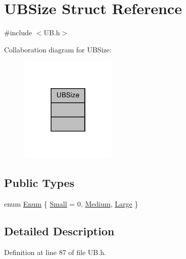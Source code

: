 \hypertarget{struct_u_b_size}{\section{U\-B\-Size Struct Reference}
\label{d5/d5e/struct_u_b_size}
}


{\ttfamily \#include $<$U\-B.\-h$>$}



Collaboration diagram for U\-B\-Size\-:
\nopagebreak
\begin{figure}[H]
\begin{center}
\leavevmode
\includegraphics[width=130pt]{d4/d0b/struct_u_b_size__coll__graph}
\end{center}
\end{figure}
\subsection*{Public Types}
\begin{DoxyCompactItemize}
\item 
enum \hyperlink{struct_u_b_size_a7ea37366b0131977382c1412689659a6}{Enum} \{ \hyperlink{struct_u_b_size_a7ea37366b0131977382c1412689659a6a0ac946f885859a3db87fef6e0a5411a6}{Small} =  0, 
\hyperlink{struct_u_b_size_a7ea37366b0131977382c1412689659a6ac239b174a88775ab9862fc9043931d5d}{Medium}, 
\hyperlink{struct_u_b_size_a7ea37366b0131977382c1412689659a6af6e3d630c31d154e199dc809a08f9ea4}{Large}
 \}
\end{DoxyCompactItemize}


\subsection{Detailed Description}


Definition at line 87 of file U\-B.\-h.



